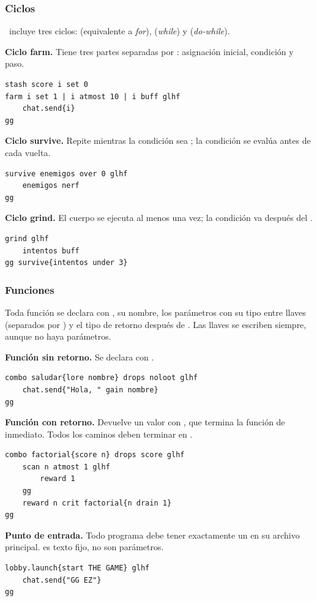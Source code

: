 \subsubsection{Ciclos}

\ggez\ incluye tres ciclos:  (equivalente a \emph{for}),  (\emph{while}) y  (\emph{do-while}).

\textbf{Ciclo farm.} Tiene tres partes separadas por \kw{|}: asignación inicial, condición y paso.
\begin{lstlisting}
stash score i set 0
farm i set 1 | i atmost 10 | i buff glhf
    chat.send{i}
gg
\end{lstlisting}

\textbf{Ciclo survive.} Repite mientras la condición sea ; la condición se evalúa antes de cada vuelta.
\begin{lstlisting}
survive enemigos over 0 glhf
    enemigos nerf
gg
\end{lstlisting}

\textbf{Ciclo grind.} El cuerpo se ejecuta al menos una vez; la condición va después del .
\begin{lstlisting}
grind glhf
    intentos buff
gg survive{intentos under 3}
\end{lstlisting}

\subsubsection{Funciones}

Toda función se declara con , su nombre, los parámetros con su tipo entre llaves (separados por \kw{|}) y el tipo de retorno después de . Las llaves se escriben siempre, aunque no haya parámetros.

\textbf{Función sin retorno.} Se declara con .
\begin{lstlisting}
combo saludar{lore nombre} drops noloot glhf
    chat.send{"Hola, " gain nombre}
gg
\end{lstlisting}

\textbf{Función con retorno.} Devuelve un valor con , que termina la función de inmediato. Todos los caminos deben terminar en .
\begin{lstlisting}
combo factorial{score n} drops score glhf
    scan n atmost 1 glhf
        reward 1
    gg
    reward n crit factorial{n drain 1}
gg
\end{lstlisting}

\textbf{Punto de entrada.} Todo programa debe tener exactamente un  en su archivo principal.  es texto fijo, no son parámetros.
\begin{lstlisting}
lobby.launch{start THE GAME} glhf
    chat.send{"GG EZ"}
gg
\end{lstlisting}

